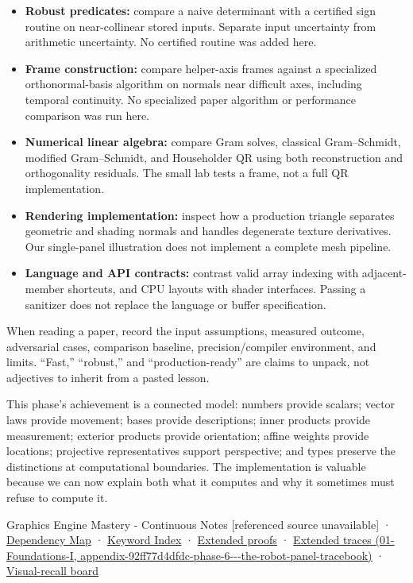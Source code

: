 \begin{itemize}
\tightlist
\item
  \textbf{Robust predicates:} compare a naive determinant with a certified sign routine on near-collinear stored inputs. Separate input uncertainty from arithmetic uncertainty. No certified routine was added here.
\item
  \textbf{Frame construction:} compare helper-axis frames against a specialized orthonormal-basis algorithm on normals near difficult axes, including temporal continuity. No specialized paper algorithm or performance comparison was run here.
\item
  \textbf{Numerical linear algebra:} compare Gram solves, classical Gram--Schmidt, modified Gram--Schmidt, and Householder QR using both reconstruction and orthogonality residuals. The small lab tests a frame, not a full QR implementation.
\item
  \textbf{Rendering implementation:} inspect how a production triangle separates geometric and shading normals and handles degenerate texture derivatives. Our single-panel illustration does not implement a complete mesh pipeline.
\item
  \textbf{Language and API contracts:} contrast valid array indexing with adjacent-member shortcuts, and CPU layouts with shader interfaces. Passing a sanitizer does not replace the language or buffer specification.
\end{itemize}

When reading a paper, record the input assumptions, measured outcome, adversarial cases, comparison baseline, precision/compiler environment, and limits. ``Fast,'' ``robust,'' and ``production-ready'' are claims to unpack, not adjectives to inherit from a pasted lesson.

This phase's achievement is a connected model: numbers provide scalars; vector laws provide movement; bases provide descriptions; inner products provide measurement; exterior products provide orientation; affine weights provide locations; projective representatives support perspective; and types preserve the distinctions at computational boundaries. The implementation is valuable because we can now explain both what it computes and why it sometimes must refuse to compute it.

{Graphics Engine Mastery - Continuous Notes {[}referenced source unavailable{]}} · \hyperref[appendix-4ad47bdd269a]{Dependency Map} · \hyperref[appendix-a6d556a4ef50]{Keyword Index} · \hyperref[02-foundations-ii-ch039-phase-6---geometry-reconstruction-proofs]{Extended proofs} · \href{../01-Foundations-I/main.pdf\#nameddest=appendix-92ff77d4dfdc-phase-6---the-robot-panel-tracebook}{Extended traces (01-Foundations-I, appendix-92ff77d4dfdc-phase-6-\/-\/-the-robot-panel-tracebook)} · \hyperref[appendix-38d9c8aca357]{Visual-recall board}

